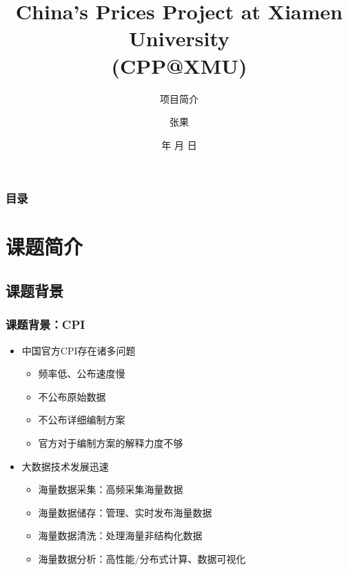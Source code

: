 \documentclass{beamer}
\begin{document}
\title{China's Prices Project at Xiamen University\\(CPP@XMU)}
\subtitle{项目简介}

\author{张果}


\renewcommand{\today}{\number\year 年 \number\month 月 \number\day 日}
\date{\today}

\subject{Presentations}

\begin{frame}
\titlepage
\end{frame}

\begin{frame}
\frametitle{目录}
\begin{multicols}{2}
\small
\tableofcontents
\end{multicols}
\end{frame}

\section{课题简介}
\subsection{课题背景}
\begin{frame}
\frametitle{课题背景：CPI}
\begin{itemize}
  \item 中国官方CPI存在诸多问题
  \begin{itemize}
    \item 频率低、公布速度慢
    \item 不公布原始数据
    \item 不公布详细编制方案
    \item 官方对于编制方案的解释力度不够
  \end{itemize}
  \item 大数据技术发展迅速
  \begin{itemize}
    \item 海量数据采集：高频采集海量数据
    \item 海量数据储存：管理、实时发布海量数据
    \item 海量数据清洗：处理海量非结构化数据
    \item 海量数据分析：高性能/分布式计算、数据可视化
  \end{itemize}
\end{itemize}
\end{frame}
\end{document}
